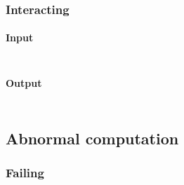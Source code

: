 \subsubsection{Interacting}\hypertarget{interacting}{}\label{interacting}

\paragraph{Input}\hypertarget{input}{}\label{input}

\begin{align*}
  [ \
  \KEY{Funcon} \quad & \NAMEHYPER{../../../../../Funcons-beta/Computations/Normal}{Interacting}{read}
  \ ]
\end{align*}
\paragraph{Output}\hypertarget{output}{}\label{output}

\begin{align*}
  [ \
  \KEY{Funcon} \quad & \NAMEHYPER{../../../../../Funcons-beta/Computations/Normal}{Interacting}{print}
  \ ]
\end{align*}
\subsection{Abnormal computation}\hypertarget{abnormal-computation}{}\label{abnormal-computation}

\subsubsection{Failing}\hypertarget{failing}{}\label{failing}

\begin{align*}
  [ \
  \KEY{Funcon} \quad & \NAMEHYPER{../../../../../Funcons-beta/Computations/Abnormal}{Failing}{finalise-failing} \\
  \KEY{Funcon} \quad & \NAMEHYPER{../../../../../Funcons-beta/Computations/Abnormal}{Failing}{fail} \\
  \KEY{Funcon} \quad & \NAMEHYPER{../../../../../Funcons-beta/Computations/Abnormal}{Failing}{else} \\
  \KEY{Funcon} \quad & \NAMEHYPER{../../../../../Funcons-beta/Computations/Abnormal}{Failing}{checked} \\
  \KEY{Funcon} \quad & \NAMEHYPER{../../../../../Funcons-beta/Computations/Abnormal}{Failing}{check-true}
  \ ]
\end{align*}
